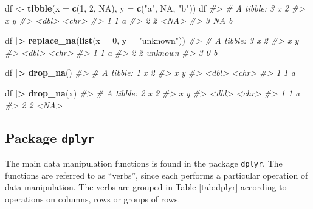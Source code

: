 \documentclass[
]{book}
\newenvironment{Shaded}{\begin{snugshade}}{\end{snugshade}}
\newcommand{\AttributeTok}[1]{\textcolor[rgb]{0.13,0.29,0.53}{#1}}
\newcommand{\CommentTok}[1]{\textcolor[rgb]{0.56,0.35,0.01}{\textit{#1}}}
\newcommand{\ConstantTok}[1]{\textcolor[rgb]{0.56,0.35,0.01}{#1}}
\newcommand{\DecValTok}[1]{\textcolor[rgb]{0.00,0.00,0.81}{#1}}
\newcommand{\FunctionTok}[1]{\textcolor[rgb]{0.13,0.29,0.53}{\textbf{#1}}}
\newcommand{\NormalTok}[1]{#1}
\newcommand{\OtherTok}[1]{\textcolor[rgb]{0.56,0.35,0.01}{#1}}
\newcommand{\SpecialCharTok}[1]{\textcolor[rgb]{0.81,0.36,0.00}{\textbf{#1}}}
\newcommand{\StringTok}[1]{\textcolor[rgb]{0.31,0.60,0.02}{#1}}
\begin{document}
\begin{Shaded}
\begin{Highlighting}[]
\NormalTok{df }\OtherTok{\textless{}{-}} \FunctionTok{tibble}\NormalTok{(}\AttributeTok{x =} \FunctionTok{c}\NormalTok{(}\DecValTok{1}\NormalTok{, }\DecValTok{2}\NormalTok{, }\ConstantTok{NA}\NormalTok{), }\AttributeTok{y =} \FunctionTok{c}\NormalTok{(}\StringTok{"a"}\NormalTok{, }\ConstantTok{NA}\NormalTok{, }\StringTok{"b"}\NormalTok{))}
\NormalTok{df}
\CommentTok{\#\textgreater{} \# A tibble: 3 x 2}
\CommentTok{\#\textgreater{}       x y    }
\CommentTok{\#\textgreater{}   \textless{}dbl\textgreater{} \textless{}chr\textgreater{}}
\CommentTok{\#\textgreater{} 1     1 a    }
\CommentTok{\#\textgreater{} 2     2 \textless{}NA\textgreater{} }
\CommentTok{\#\textgreater{} 3    NA b}
  
\NormalTok{df }\SpecialCharTok{|\textgreater{}} \FunctionTok{replace\_na}\NormalTok{(}\FunctionTok{list}\NormalTok{(}\AttributeTok{x =} \DecValTok{0}\NormalTok{, }\AttributeTok{y =} \StringTok{"unknown"}\NormalTok{))}
\CommentTok{\#\textgreater{} \# A tibble: 3 x 2}
\CommentTok{\#\textgreater{}       x y      }
\CommentTok{\#\textgreater{}   \textless{}dbl\textgreater{} \textless{}chr\textgreater{}  }
\CommentTok{\#\textgreater{} 1     1 a      }
\CommentTok{\#\textgreater{} 2     2 unknown}
\CommentTok{\#\textgreater{} 3     0 b}
  
\NormalTok{df }\SpecialCharTok{|\textgreater{}} \FunctionTok{drop\_na}\NormalTok{()}
\CommentTok{\#\textgreater{} \# A tibble: 1 x 2}
\CommentTok{\#\textgreater{}       x y    }
\CommentTok{\#\textgreater{}   \textless{}dbl\textgreater{} \textless{}chr\textgreater{}}
\CommentTok{\#\textgreater{} 1     1 a}

\NormalTok{df }\SpecialCharTok{|\textgreater{}} \FunctionTok{drop\_na}\NormalTok{(x)}
\CommentTok{\#\textgreater{} \# A tibble: 2 x 2}
\CommentTok{\#\textgreater{}       x y    }
\CommentTok{\#\textgreater{}   \textless{}dbl\textgreater{} \textless{}chr\textgreater{}}
\CommentTok{\#\textgreater{} 1     1 a    }
\CommentTok{\#\textgreater{} 2     2 \textless{}NA\textgreater{}}
\end{Highlighting}
\end{Shaded}

\subsection{\texorpdfstring{Package \texttt{dplyr}}{Package dplyr}}\label{dplyr}

The main data manipulation functions is found in the package \texttt{dplyr}. The functions are referred to as ``verbs'', since each performs a particular operation of data manipulation. The verbs are grouped in Table \ref{tab:dplyr} according to operations on columns, rows or groups of rows.
\end{document}
